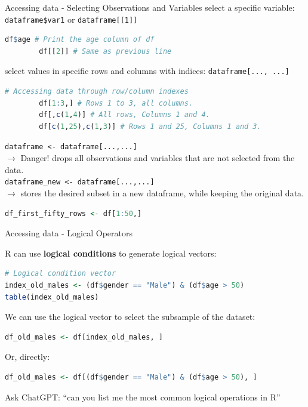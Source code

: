 \documentclass[9pt,aspectratio=169]{beamer}
\begin{document}
\begin{frame}[fragile]{Accessing data - Selecting Observations and Variables}
select a specific variable: \texttt{dataframe\$var1} or \texttt{dataframe[[1]]}
\begin{lstlisting}[language=R, basicstyle=\ttfamily\tiny]
        df$age # Print the age column of df
        df[[2]] # Same as previous line
 \end{lstlisting}
select values in specific rows and columns with indices: \texttt{dataframe[..., ...]}
\pause
\begin{lstlisting}[language=R, basicstyle=\ttfamily\tiny]
        # Accessing data through row/column indexes
        df[1:3,] # Rows 1 to 3, all columns.
        df[,c(1,4)] # All rows, Columns 1 and 4.
        df[c(1,25),c(1,3)] # Rows 1 and 25, Columns 1 and 3.
 \end{lstlisting}
\pause
\texttt{dataframe <- dataframe[...,...]}\\
$\rightarrow$ \alert{Danger!} drops all observations and variables that are not selected from the data. \\
\vspace{+0.083cm}
\pause
\texttt{dataframe\_new <- dataframe[...,...]}\\
$\rightarrow$ stores the desired subset in a new dataframe, while keeping the original data.
\begin{lstlisting}[language=R, basicstyle=\ttfamily\small]
        df_first_fifty_rows <- df[1:50,]
 \end{lstlisting}
\end{frame}


\begin{frame}[fragile]{Accessing data - Logical Operators}

R can use \textbf{logical conditions} to generate logical vectors:
\begin{lstlisting}[language=R, basicstyle=\ttfamily\small, frame=single]
# Logical condition vector
index_old_males <- (df$gender == "Male") & (df$age > 50)
table(index_old_males)
\end{lstlisting}

\pause
We can use the logical vector to select the subsample of the dataset:
\begin{lstlisting}[language=R, basicstyle=\ttfamily\small, frame=single]
df_old_males <- df[index_old_males, ]
\end{lstlisting}

Or, directly:
\begin{lstlisting}[language=R, basicstyle=\ttfamily\small, frame=single]
df_old_males <- df[(df$gender == "Male") & (df$age > 50), ]
\end{lstlisting}

\pause
Ask ChatGPT: ``can you list me the most common logical operations in R''

\end{frame}
\end{document}
